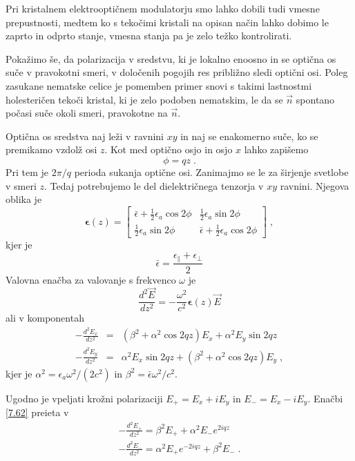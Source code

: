 \documentclass[11pt,fleqn]{book} %
\begin{document}
Pri kristalnem elektrooptičnem modulatorju smo lahko dobili tudi vmesne
prepustnosti, medtem ko s tekočimi kristali na opisan način lahko
dobimo le zaprto in odprto stanje, vmesna stanja pa je zelo težko
kontrolirati.

Pokažimo še, da polarizacija v sredstvu, ki je lokalno enoosno in
se optična os suče v pravokotni smeri, v določenih pogojih res približno
sledi optični osi. Poleg zasukane nematske celice je pomemben primer
snovi s takimi lastnostmi holesteričen tekoči kristal, ki je zelo
podoben nematskim, le da se $\vec{n}$ spontano počasi suče okoli
smeri, pravokotne na $\vec{n}$.

Optična os sredstva naj leži v ravnini $xy$ in naj se enakomerno
suče, ko se premikamo vzdolž osi $z$. Kot med optično osjo in osjo
$x$ lahko zapišemo 
\begin{equation}
\phi=qz\;.\label{7.58}
\end{equation}
 Pri tem je $2\pi/q$ perioda sukanja optične osi. Zanimajmo se le
za širjenje svetlobe v smeri $z$. Tedaj potrebujemo le del dielektričnega
tenzorja v $xy$ ravnini. Njegova oblika je 
\begin{equation}
\boldsymbol{\epsilon}(z)=\left[\begin{array}{cc}
\bar{\epsilon}+\frac{1}{2}\epsilon_{a}\cos2\phi & \frac{1}{2}\epsilon_{a}\sin2\phi\\
\frac{1}{2}\epsilon_{a}\sin2\phi & \bar{\epsilon}+\frac{1}{2}\epsilon_{a}\cos2\phi
\end{array}\right]\;,\label{7.59}
\end{equation}
 kjer je 
\begin{equation}
\bar{\epsilon}=\frac{\epsilon_{\parallel}+\epsilon_{\perp}}{2}\label{7.60}
\end{equation}
 Valovna enačba za valovanje s frekvenco $\omega$ je 
\begin{equation}
\frac{d^{2}\vec{E}}{dz^{2}}=-\frac{\omega^{2}}{c^{2}}\boldsymbol{\epsilon}(z)\vec{E}\label{7.61}
\end{equation}
 ali v komponentah 
\begin{eqnarray}
-\frac{d^{2}E_{x}}{dz^{2}} & = & (\beta^{2}+\alpha^{2}\cos2qz)E_{x}+\alpha^{2}E_{y}\sin2qz\nonumber \\
-\frac{d^{2}E_{y}}{dz^{2}} & = & \alpha^{2}E_{x}\sin2qz+(\beta^{2}+\alpha^{2}\cos2qz)E_{y}\;,
\end{eqnarray}
 kjer je $\alpha^{2}=\epsilon_{a}\omega^{2}/(2c^{2})$ in $\beta^{2}=\bar{\epsilon}\omega^{2}/c^{2}$.

Ugodno je vpeljati krožni polarizaciji $E_{+}=E_{x}+iE_{y}$ in $E_{-}=E_{x}-iE_{y}$.
Enačbi \ref{7.62} preieta v 
\begin{eqnarray}
-\frac{d^{2}E_{+}}{dz^{2}}=\beta^{2}E_{+}+\alpha^{2}E_{-}e^{2iqz}\nonumber \\
-\frac{d^{2}E_{-}}{dz^{2}}=\alpha^{2}E_{+}e^{-2iqz}+\beta^{2}E_{-}\;.
\end{eqnarray}
\end{document}
